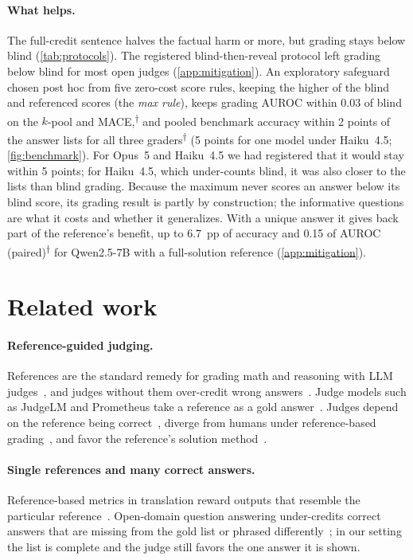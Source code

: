 \documentclass{article}
\newcommand{\ph}{\textsuperscript{$\dagger$}}
\begin{document}
\paragraph{What helps.}
The full-credit sentence halves the factual harm or more, but grading stays below blind (\cref{tab:protocols}). The registered blind-then-reveal protocol left grading below blind for most open judges (\cref{app:mitigation}). An exploratory safeguard chosen post hoc from five zero-cost score rules, keeping the higher of the blind and referenced scores (the \emph{max rule}), keeps grading AUROC within 0.03 of blind on the $k$-pool and \textsc{MACE},\ph{} and pooled benchmark accuracy within 2 points of the answer lists for all three graders\ph{} (5 points for one model under Haiku~4.5; \cref{fig:benchmark}). For Opus~5 and Haiku~4.5 we had registered that it would stay within 5 points; for Haiku~4.5, which under-counts blind, it was also closer to the lists than blind grading. Because the maximum never scores an answer below its blind score, its grading result is partly by construction; the informative questions are what it costs and whether it generalizes. With a unique answer it gives back part of the reference's benefit, up to 6.7~pp of accuracy and 0.15 of AUROC (paired)\ph{} for Qwen2.5-7B with a full-solution reference (\cref{app:mitigation}).

\raggedbottom
\section{Related work}
\label{sec:related}

\paragraph{Reference-guided judging.}
References are the standard remedy for grading math and reasoning with LLM judges~\citep{zheng2023judging,refguided2024,chen2026rethinking}, and judges without them over-credit wrong answers~\citep{generous2026}.
Judge models such as JudgeLM and Prometheus take a reference as a gold answer~\citep{zhu2023judgelm,kim2024prometheus}.
Judges depend on the reference being correct~\citep{judgingref2026,krumdick2025nofreelabels}, diverge from humans under reference-based grading~\citep{thakur2024judging}, and favor the reference's solution method~\citep{fixation2025}.

\paragraph{Single references and many correct answers.}
Reference-based metrics in translation reward outputs that resemble the particular reference~\citep{freitag2020bleu,fomicheva2016reference}. Open-domain question answering under-credits correct answers that are missing from the gold list or phrased differently~\citep{min2020ambigqa,si2021whatsinaname,bulian2022tomayto,kamalloo2023evaluating}; in our setting the list is complete and the judge still favors the one answer it is shown.
\end{document}
